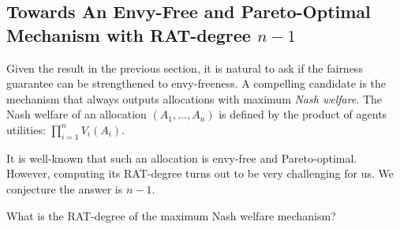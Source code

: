 \subsection{Towards An Envy-Free and Pareto-Optimal Mechanism with RAT-degree $n-1$}
Given the result in the previous section, it is natural to ask if the fairness guarantee can be strengthened to envy-freeness.
A compelling candidate is the mechanism that always outputs allocations with maximum \emph{Nash welfare}.
The Nash welfare of an allocation $(A_1,\ldots,A_n)$ is defined by the product of agents utilities:
$\displaystyle \prod_{i=1}^nV_i(A_i).$

It is well-known that such an allocation is envy-free and Pareto-optimal.
However, computing its RAT-degree turns out to be very challenging for us.
We conjecture the answer is $n-1$.
\begin{open}
    What is the RAT-degree of the maximum Nash welfare mechanism?
\end{open}
